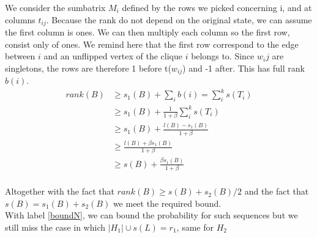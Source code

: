 \documentclass[12pt]{article}
\begin{document}
We consider the sumbatrix $M_i$ defined by the rows we picked concerning i, and at columns $t_{ij}$. Because the rank do not depend on the original state, we can assume the first column is ones. We can then multiply each column so the first row, consist only of ones. We remind here that the first row correspond to the edge between $i$ and an unflipped vertex of the clique $i$ belongs to. Since $w_ij$ are singletons, the rows are therefore 1 before t($w_{ij}$) and -1 after. This has full rank $b(i)$. \\

\begin{equation*}
\begin{split}
rank(B) & \geq s_1(B) + \sum_{i}b(i) = \sum_i^k s(T_i)\\
&\geq s_1(B) + \frac{1}{1 + \beta}\sum_i^k s(T_i)\\
&\geq s_1(B) + \frac{l(B) - s_1(B)}{1 + \beta}\\
& \geq \frac{l(B) + \beta s_1(B)}{1 + \beta}\\
&\geq s(B) + \frac{\beta s_1(B)}{1 + \beta}\\
\end{split}
\end{equation*}  

Altogether with the fact that $rank(B) \geq s(B) + s_2(B)/2$ and the fact that $s(B) = s_1(B) + s_2(B)$ we meet the required bound.\\

With label \ref{boundN}, we can bound the probability for such sequences but we still miss the case in which $|H_1| \cup s(L) = r_1$, same for $H_2$
\end{document}
